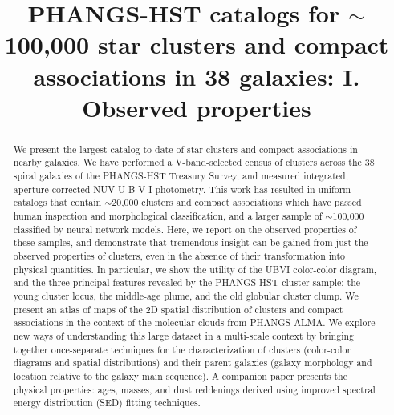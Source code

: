 \documentclass[]{aastex631}
\begin{document}
\title{PHANGS-HST catalogs for $\sim$100,000 star clusters and compact associations in 38 galaxies: I. Observed properties}





\begin{abstract}

We present the largest catalog to-date of star clusters and compact associations in nearby galaxies.  We have performed a V-band-selected census of clusters across the 38 spiral galaxies of the PHANGS-HST Treasury Survey, and measured integrated, aperture-corrected NUV-U-B-V-I photometry.
This work has resulted in uniform catalogs that contain $\sim$20,000 clusters and compact associations which have passed human inspection and morphological classification, and a larger sample of $\sim$100,000 classified by neural network models. 
Here, we report on the observed properties of these samples, and demonstrate that tremendous insight can be gained from just the observed properties of clusters, even in the absence of their transformation into physical quantities. 
In particular, we show the utility of the UBVI color-color diagram, and the three principal features revealed by the PHANGS-HST cluster sample: the young cluster locus, the middle-age plume, and the old globular cluster clump.  
We present an atlas of maps of the 2D spatial distribution of clusters and compact associations in the context of the molecular clouds from PHANGS-ALMA.  We explore new ways of understanding this large dataset in a multi-scale context by bringing together once-separate techniques for the characterization of clusters (color-color diagrams and spatial distributions) and their parent galaxies (galaxy morphology and location relative to the galaxy main sequence). 
A companion paper presents the physical properties: ages, masses, and dust reddenings derived using improved spectral energy distribution (SED) fitting techniques.

\end{abstract}

\end{document}
